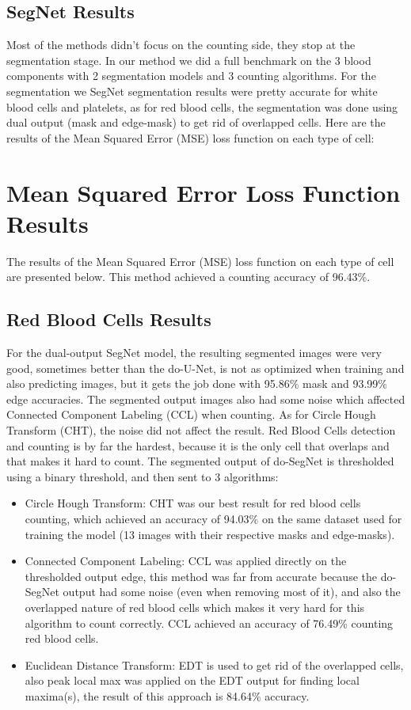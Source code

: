 \documentclass[conference]{IEEEtran}
\begin{document}
\subsection{SegNet Results}
Most of the methods didn’t focus on the counting side, they stop at the segmentation stage. In our method we did a full benchmark on the 3 blood components with 2 segmentation models and 3 counting algorithms. For the segmentation we 
SegNet segmentation results were pretty accurate for white blood cells and platelets, as for red blood cells, the segmentation was done using dual output (mask and edge-mask) to get rid of overlapped cells.
Here are the results of the Mean Squared Error (MSE) loss function on each type of cell:

\section{Mean Squared Error Loss Function Results}
The results of the Mean Squared Error (MSE) loss function on each type of cell are presented below.
This method achieved a counting accuracy of 96.43\%.
\subsection{Red Blood Cells Results}
For the dual-output SegNet model, the resulting segmented images were very good, sometimes better than the do-U-Net, is not as optimized when training and also predicting images, but it gets the job done with 95.86\% mask and 93.99\% edge accuracies. The segmented output images also had some noise which affected Connected Component Labeling (CCL) when counting. As for Circle Hough Transform (CHT), the noise did not affect the result. Red Blood Cells detection and counting is by far the hardest, because it is the only cell that overlaps and that makes it hard to count. The segmented output of do-SegNet is thresholded using a binary threshold, and then sent to 3 algorithms:
\begin{itemize}
\item Circle Hough Transform: CHT was our best result for red blood cells counting, which achieved an accuracy of 94.03\% on the same dataset used for training the model (13 images with their respective masks and edge-masks).
\item Connected Component Labeling: CCL was applied directly on the thresholded output edge, this method was far from accurate because the do-SegNet output had some noise (even when removing most of it), and also the overlapped nature of red blood cells which makes it very hard for this algorithm to count correctly. CCL achieved an accuracy of 76.49\% counting red blood cells.
\item Euclidean Distance Transform: EDT is used to get rid of the overlapped cells, also peak local max was applied on the EDT output for finding local maxima(s), the result of this approach is 84.64\% accuracy.
\end{itemize}
\end{document}
